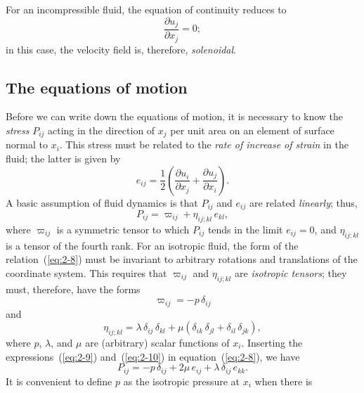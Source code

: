 For an incompressible fluid, the equation of continuity reduces to
\begin{equation}
\label{eq:2-6}
\frac{\partial u_j}{\partial x_j} = 0;
\end{equation}
in this case, the velocity field is, therefore, \emph{solenoidal}.

\subsection{The equations of motion}\label{sec:7b}

Before we can write down the equations of motion, it is necessary to
know the \emph{stress} $P_{ij}$ acting in the direction of $x_j$ per unit area on an
element of surface normal to $x_i$. This stress must be related to the \emph{rate
of increase of strain} in the fluid; the latter is given by
\begin{equation}
\label{eq:2-7}
e_{ij} = \frac{1}{2}\!\left(\frac{\partial u_i}{\partial x_j}+\frac{\partial u_j}{\partial x_i}\right)\!.
\end{equation}
A basic assumption of fluid dynamics is that $P_{ij}$ and $e_{ij}$ are related \emph{linearly};
thus,
\begin{equation}
\label{eq:2-8}
P_{ij} = \varpi_{ij} + \eta_{ij;kl}\,e_{kl},
\end{equation}
where $\varpi_{ij}$ is a symmetric tensor to which $P_{ij}$ tends in the limit $e_{ij} = 0$,
and $\eta_{ij;kl}$ is a tensor of the fourth rank. For an isotropic fluid, the form
of the relation~(\ref{eq:2-8}) must be invariant to arbitrary rotations and translations of the coordinate system. This requires that $\varpi_{ij}$ and $\eta_{ij;kl}$ are
\emph{isotropic tensors}; they must, therefore, have the forms
\begin{equation}
\label{eq:2-9}
\varpi_{ij} = -p\,\delta_{ij}
\end{equation}
and
\begin{equation}
\label{eq:2-10}
\eta_{ij;kl} = \lambda\,\delta_{ij}\,\delta_{kl} + \mu(\delta_{ik}\,\delta_{jl} + \delta_{il}\,\delta_{jk}),
\end{equation}
where $p$, $\lambda$, and $\mu$ are (arbitrary) scalar functions of $x_i$. Inserting the
expressions~(\ref{eq:2-9}) and~(\ref{eq:2-10}) in equation~(\ref{eq:2-8}), we have
\begin{equation}
\label{eq:2-11}
P_{ij} = -p\,\delta_{ij} + 2\mu\,e_{ij} + \lambda\,\delta_{ij}\,e_{kk}.
\end{equation}
It is convenient to define $p$ as the isotropic pressure at $x_i$ when there is
